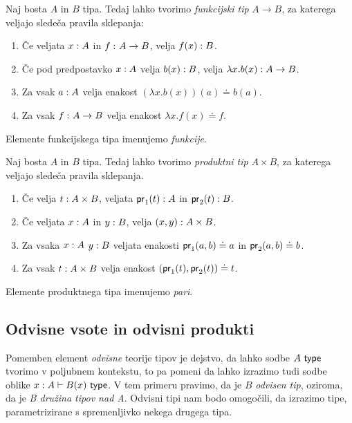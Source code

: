\begin{definicija}
  Naj bosta \(A\) in \(B\) tipa. Tedaj lahko tvorimo \emph{funkcijski tip} \(A \to B\),
  za katerega veljajo sledeča pravila sklepanja:
  \begin{enumerate}
  \item Če veljata \(x : A\) in \(f \,\colon A \to B\), velja
    \(f(x) : B\).
  \item Če pod predpostavko \(x : A\) velja \(b(x) : B\),
    velja \(\lambda x.b(x) : A \to B\).
  \item Za vsak \(a : A\) velja enakost \((\lambda x.b(x))(a) \doteq b(a)\).
  \item Za vsak \(f \,\colon A \to B\) velja enakost \(\lambda x.f(x) \doteq f\).
  \end{enumerate}
  Elemente funkcijskega tipa imenujemo \emph{funkcije}.
\end{definicija}
\begin{definicija}
  Naj bosta \(A\) in \(B\) tipa. Tedaj lahko tvorimo \emph{produktni tip} \(A \times B\),
  za katerega veljajo sledeča pravila sklepanja.
  \begin{enumerate}
  \item Če velja \(t : A \times B\), veljata \(\textnormal{\textsf{pr}}_{1}(t) : A\) in
    \(\textnormal{\textsf{pr}}_{2}(t) : B\).
  \item Če veljata \(x : A\) in \(y : B\), velja
    \((x, y) : A \times B\).
  \item Za vsaka \(x : A\) \(y : B\) veljata enakosti
    \(\textnormal{\textsf{pr}}_{1}(a, b) \doteq a\) in \(\textnormal{\textsf{pr}}_{2}(a, b) \doteq b\).
  \item Za vsak \(t : A \times B\) velja enakost
    \((\textnormal{\textsf{pr}}_{1}(t), \textnormal{\textsf{pr}}_{2}(t)) \doteq t\).
  \end{enumerate}
  Elemente produktnega tipa imenujemo \emph{pari}.
\end{definicija}

\subsection{Odvisne vsote in odvisni produkti}
Pomemben element \emph{odvisne} teorije tipov je dejstvo, da lahko sodbe \(A\ \textnormal{\textsf{type}}\)
tvorimo v poljubnem kontekstu, to pa pomeni da lahko izrazimo tudi sodbe
oblike \(x : A \vdash B(x)\ \textnormal{\textsf{type}}\).
V tem primeru pravimo, da je \(B\) \emph{odvisen tip},
oziroma, da je \emph{B družina tipov nad A}. Odvisni tipi nam bodo omogočili, da izrazimo
tipe, parametrizirane s spremenljivko nekega drugega tipa.

